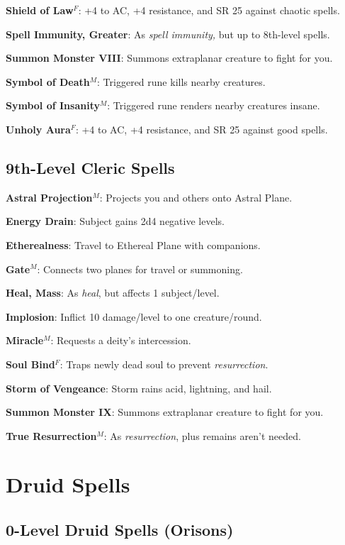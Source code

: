 \textbf{Shield of Law}\(^{F}\): +4 to AC, +4 resistance, and SR 25 against chaotic spells.

\textbf{Spell Immunity, Greater}: As \textit{spell immunity, }but up to 8th-level spells.

\textbf{Summon Monster VIII}: Summons extraplanar creature to fight for you.

\textbf{Symbol of Death}\(^{M}\): Triggered rune kills nearby creatures.

\textbf{Symbol of Insanity}\(^{M}\): Triggered rune renders nearby creatures insane.

\textbf{Unholy Aura}\(^{F}\): +4 to AC, +4 resistance, and SR 25 against good spells.

\subsection{9th-Level Cleric Spells}


\textbf{Astral Projection}\(^{M}\): Projects you and others onto Astral Plane.

\textbf{Energy Drain}: Subject gains 2d4 negative levels.

\textbf{Etherealness}: Travel to Ethereal Plane with companions.

\textbf{Gate}\(^{M}\): Connects two planes for travel or summoning.

\textbf{Heal, Mass}: As \textit{heal}, but affects 1 subject/level.

\textbf{Implosion}: Inflict 10 damage/level to one creature/round.

\textbf{Miracle}\(^{M}\): Requests a deity's intercession.

\textbf{Soul Bind}\(^{F}\): Traps newly dead soul to prevent \textit{resurrection}.

\textbf{Storm of Vengeance}: Storm rains acid, lightning, and hail.

\textbf{Summon Monster IX}: Summons extraplanar creature to fight for you.

\textbf{True Resurrection}\(^{M}\): As \textit{resurrection}, plus remains aren't needed.

\section{Druid Spells}


\subsection{0-Level Druid Spells (Orisons)}


